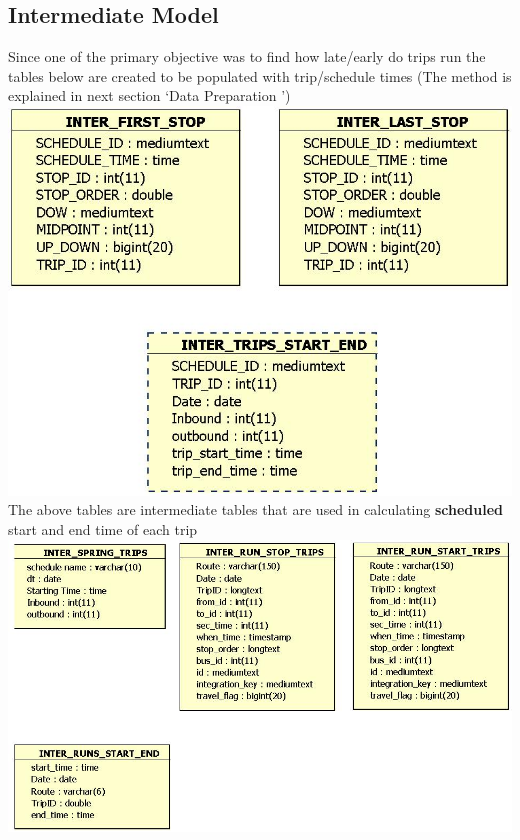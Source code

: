 \documentclass[12pt]{article}\usepackage[]{graphicx}\usepackage[]{color}
\begin{document}
\subsection{Intermediate Model}
Since one of the primary objective was to find how late/early do trips run the tables below are created to be populated with trip/schedule times (The method is explained in next section \lq Data Preparation \rq)\\
\includegraphics[scale=0.5]{resources/Inter_schedule}\\[1cm] 
The above tables are intermediate tables that are used in calculating \textbf{scheduled} start and end time of each trip\\
\includegraphics[scale=0.5]{resources/Inter_runs}\\[1cm] 
\end{document}
